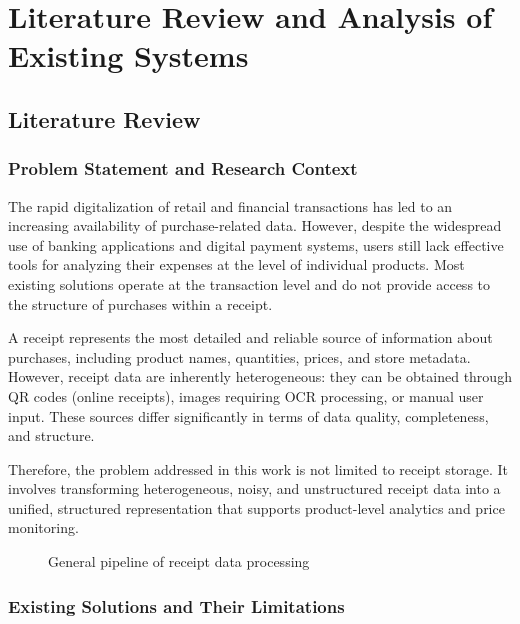 %
%
\chapter{Literature Review and Analysis of
Existing Systems}
\label{chap:01}
\setlength{\parskip}{1em}
%
\section{Literature Review}

\subsection{Problem Statement and Research Context}

The rapid digitalization of retail and financial transactions has led to an increasing availability of purchase-related data. However, despite the widespread use of banking applications and digital payment systems, users still lack effective tools for analyzing their expenses at the level of individual products. Most existing solutions operate at the transaction level and do not provide access to the structure of purchases within a receipt.

A receipt represents the most detailed and reliable source of information about purchases, including product names, quantities, prices, and store metadata. However, receipt data are inherently heterogeneous: they can be obtained through QR codes (online receipts), images requiring OCR processing, or manual user input. These sources differ significantly in terms of data quality, completeness, and structure.

Therefore, the problem addressed in this work is not limited to receipt storage. It involves transforming heterogeneous, noisy, and unstructured receipt data into a unified, structured representation that supports product-level analytics and price monitoring.

\begin{figure}[h]
\centering
{}
\caption{General pipeline of receipt data processing}
\end{figure}

\subsection{Existing Solutions and Their Limitations}

